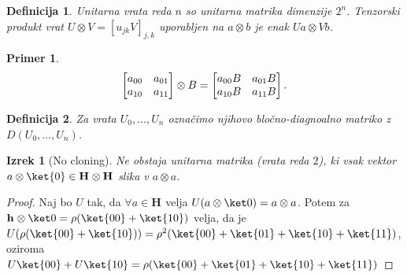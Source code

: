 \documentclass[a4paper]{article}
\newtheorem{theorem}{Izrek}
\newtheorem{definition}{Definicija}
\newtheorem*{example}{Primer}
\newcommand{\p}[1]{\left( {#1} \right)}
\newcommand{\hh}[1][]{\mathbf{h}_{#1}}
\renewcommand{\H}[1][]{\mathbf{H}_{#1}}
\begin{document}
\begin{definition}%
    Unitarna vrata reda \( n \) so unitarna matrika dimenzije \( 2^n \).
    Tenzorski produkt vrat \( U \otimes V = [u_{jk}V]_{j,k} \) uporabljen na \(a\otimes b\) je enak \( Ua \otimes Vb \).
\end{definition}
\begin{example}
    \[
        \begin{bmatrix}
            a_{00} & a_{01} \\ a_{10} & a_{11}
        \end{bmatrix}
        \otimes B
        =
        \begin{bmatrix}
            a_{00} B & a_{01} B \\ a_{10} B & a_{11} B
        \end{bmatrix}\text.\qedhere\]
\end{example}
\begin{definition}%
    Za vrata \( U_0,\dots,U_n \) označimo njihovo bločno-diagnoalno matriko z \( D{\p{U_0,\dots,U_n}} \).
\end{definition}

\begin{theorem}[No cloning]
    Ne obstaja unitarna matrika (vrata reda \(2\)), ki vsak vektor \(a\otimes\ket{0}\in \H\otimes\H\) slika v \(a\otimes a\).
\end{theorem}

\begin{proof}
    Naj bo \(U\) tak, da \(\forall a \in \H \) velja \( U{\p{a\otimes\ket0}} = a\otimes a \).
    Potem za \( \hh\otimes\ket0 = \rho(\ket{00} + \ket{10}) \) velja, da je \( U{\p{\rho(\ket{00} + \ket{10})}} = \rho^2(\ket{00} + \ket{01} + \ket{10} + \ket{11}) \), oziroma \(U\ket{00} + U\ket{10} = \rho(\ket{00} + \ket{01} + \ket{10} + \ket{11})\)
\end{proof}
\end{document}
